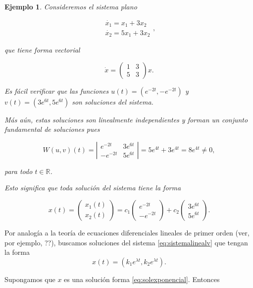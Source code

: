 \documentclass[11pt]{book}
\theoremstyle{definition}
\numberwithin{definition}{section}
\theoremstyle{theorem}
\numberwithin{theorem}{section}
\numberwithin{lemma}{section}
\numberwithin{corollary}{section}
\theoremstyle{plain}
\newtheorem{example}{Ejemplo}
\numberwithin{example}{section}
\newcommand{\R}{{\ensuremath{\mathbb{R}}}}
\begin{document}
\begin{example}
Consideremos el sistema plano

$$
	\begin{array}{l}
		\dot{x_1} = x_1 + 3x_2 \\
		\dot{x_2} = 5x_1 + 3x_2
	\end{array},
$$

que tiene forma vectorial

$$ \dot{x} = \left(
	\begin{array}{ll}
		1 & 3 \\ 5 & 3
	\end{array}
\right) x.$$

Es fácil verificar que las funciones $u(t) = (e^{-2t}, -e^{-2t})$ y $v(t) = (3e^{6t}, 5e^{6t})$ son soluciones del sistema.

Más aún, estas soluciones son linealmente independientes y forman un conjunto fundamental de soluciones pues

$$
	W(u,v)(t) =
\left|
	\begin{array}{ll}
		e^{-2t} & 3e^{6t} \\
		-e^{-2t} & 5e^{6t}
	\end{array}
\right| = 5e^{4t} + 3e^{4t} = 8e^{4t} \neq 0,
$$

para todo $t \in \R$.

Esto significa que toda solución del sistema tiene la forma

$$ x(t) = \left( \begin{array}{l} x_1(t) \\ x_2(t) \end{array} \right)
= c_1 \left( \begin{array}{l} e^{-2t} \\ -e^{-2t} \end{array} \right) + c_2 \left( \begin{array}{l} 3e^{6t} \\ 5e^{6t} \end{array} \right).$$
\end{example}

Por analogía a la teoría de ecuaciones diferenciales lineales de primer orden (ver, por ejemplo, ??), buscamos soluciones del sistema \ref{eq:sistemalinealv} que tengan la forma
\begin{equation} \label{eq:solexponencial}
x(t) = (k_1e^{\lambda t}, k_2e^{\lambda t}).
\end{equation}

Supongamos que $x$ es una solución forma \ref{eq:solexponencial}. Entonces
\end{document}

